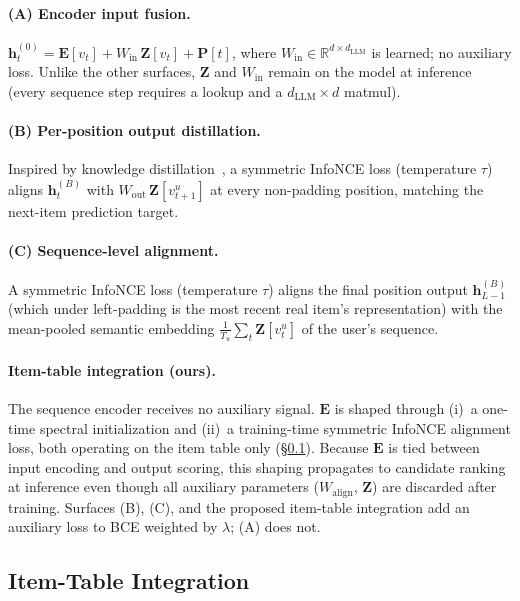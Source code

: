 \documentclass{article}
\begin{document}
\paragraph{(A) Encoder input fusion.}
$\mathbf{h}^{(0)}_t = \mathbf{E}[v_t] + W_\text{in}\, \mathbf{Z}[v_t] + \mathbf{P}[t]$,
where $W_\text{in} \in \mathbb{R}^{d \times d_\text{LLM}}$ is learned;
no auxiliary loss. Unlike the other surfaces, $\mathbf{Z}$ and
$W_\text{in}$ remain on the model at inference (every sequence step
requires a lookup and a $d_\text{LLM} \times d$ matmul).

\paragraph{(B) Per-position output distillation.}
Inspired by knowledge distillation~\cite{hinton2015distill}, a
symmetric InfoNCE loss (temperature $\tau$) aligns
$\mathbf{h}^{(B)}_t$ with $W_\text{out}\, \mathbf{Z}[v_{t+1}^u]$ at
every non-padding position, matching the next-item prediction
target.

\paragraph{(C) Sequence-level alignment.}
A symmetric InfoNCE loss (temperature $\tau$) aligns the final
position output $\mathbf{h}^{(B)}_{L-1}$ (which under left-padding
is the most recent real item's representation) with the mean-pooled
semantic embedding $\frac{1}{T_u}\sum_{t} \mathbf{Z}[v_t^u]$ of the
user's sequence.

\paragraph{Item-table integration (ours).}
The sequence encoder receives no auxiliary signal. $\mathbf{E}$ is
shaped through (i)~a one-time spectral initialization and (ii)~a
training-time symmetric InfoNCE alignment loss, both operating on
the item table only (\S\ref{sec:item-table}). Because
$\mathbf{E}$ is tied between input encoding and output scoring, this
shaping propagates to candidate ranking at inference even though all
auxiliary parameters ($W_\text{align}$, $\mathbf{Z}$) are discarded
after training. Surfaces (B), (C), and the proposed item-table
integration add an auxiliary loss to BCE weighted by $\lambda$;
(A) does not.

\subsection{Item-Table Integration}
\label{sec:item-table}
\end{document}
